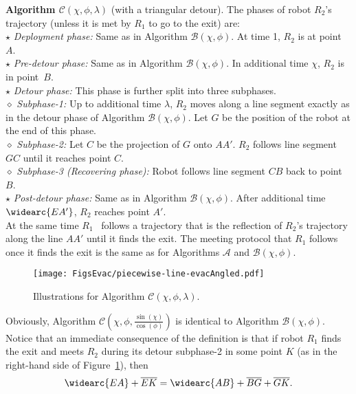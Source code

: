 \documentclass[
final
]{dmtcs-episciences}
\newcommand{\barr}[1]{\overline{#1}}
\newcommand{\sinn}[1]{\sin \left({#1}\right)}
\newcommand{\coss}[1]{\cos \left({#1}\right)}
\newcommand{\RA}{\ensuremath{R_1}}
\newcommand{\RB}{\ensuremath{R_2 }}
\newcommand{\arccc}[1]{
\widearc{#1}
}
\theoremstyle{definition}
\begin{document}
\noindent
{\bf Algorithm $\mathcal C (\chi, \phi, \lambda)$} (with a triangular detour).  
The phases of robot $\RB$'s trajectory (unless it is met by $\RA$ to go to the exit) are: \\ $\star$ \textit{Deployment phase:} 
Same as in Algorithm $\mathcal B(\chi, \phi)$. At time 1, $\RB$ is at point~$A$. 
\\
$\star$ \textit{Pre-detour phase:} 
Same as in Algorithm $\mathcal B(\chi, \phi)$. In additional time $\chi$, $\RB$ is in point~$B$.
\\
$\star$ \textit{Detour phase:} This phase is further split into three subphases. \\
\hspace*{.5cm}$\diamond$ \textit{Subphase-1:} Up to additional time $\lambda$, $\RB$ moves along a line segment exactly as in the detour phase of Algorithm $\mathcal B(\chi, \phi)$. Let $G$ be the position of the robot at the end of this phase. 
\\
\hspace*{.5cm}$\diamond$ \textit{Subphase-2:} Let $C$ be the projection of $G$ onto $AA'$. $\RB$ follows line segment $GC$ until it reaches point $C$. 
\\
\hspace*{.5cm}$\diamond$ \textit{Subphase-3 (Recovering phase):} Robot follows
line segment $CB$ back to point $B$.
\\
$\star$ \textit{Post-detour phase:}
Same as in Algorithm $\mathcal B(\chi, \phi)$. After additional time $\arccc{EA'}$, $\RB$ reaches point $A'$. \\
At the same time \RA~ follows a trajectory that is the reflection of \RB's
 trajectory along the line $AA'$ until it finds the exit. 
The meeting protocol that $\RA$ follows once it finds the exit is the same as for Algorithms $\mathcal A$ and $\mathcal B(\chi, \phi)$. 


\begin{figure}[!ht]
                \centering
                \texttt{[image: FigsEvac/piecewise-line-evacAngled.pdf]}
                \caption{Illustrations for Algorithm $\mathcal C (\chi, \phi, \lambda)$.}
                \label{fig: piecewise-line-evac New}
\end{figure}

Obviously, Algorithm $\mathcal C\left(\chi, \phi, \frac{\sinn{\chi}}{\coss{\phi}}\right)$ is identical to Algorithm $\mathcal B(\chi, \phi)$.
Notice that an immediate consequence of the definition is that if robot $\RA$ finds the exit and meets $\RB$ during its detour subphase-2 in some point $K$ (as in the right-hand side of Figure~\ref{fig: piecewise-line-evac New}), then 
\begin{equation}\label{equa: meeting condition piecewise line}
\arccc{EA}+\barr{EK}=\arccc{AB}+\barr{BG}+\barr{GK}.
\end{equation}
\end{document}
